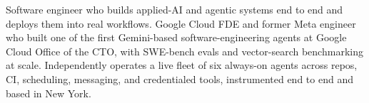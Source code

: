 


Software engineer who builds applied-AI and agentic systems end to end and deploys them into real workflows. Google Cloud FDE and former Meta engineer who built one of the first Gemini-based software-engineering agents at Google Cloud Office of the CTO, with SWE-bench evals and vector-search benchmarking at scale. Independently operates a live fleet of six always-on agents across repos, CI, scheduling, messaging, and credentialed tools, instrumented end to end and based in New York.







